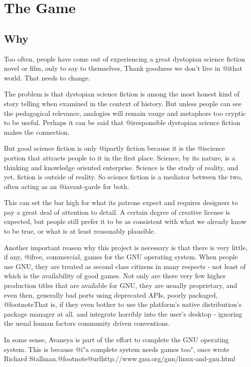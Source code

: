 \chapter{The Game}

\section{Why}
Too often, people have come out of experiencing a great dystopian science fiction novel or film, only to say to themselves, Thank goodness we don't live in @i{that} world. That needs to change.

The problem is that dystopian science fiction is among the most honest kind of story telling when examined in the context of history. But unless people can see the pedagogical relevance, analogies will remain vauge and metaphors too cryptic to be useful. Perhaps it can be said that @i{responsible} dystopian science fiction makes the connection.

But good science fiction is only @i{partly} fiction because it is the @i{science} portion that attracts people to it in the first place. Science, by its nature, is a thinking and knowledge oriented enterprise. Science is the study of reality, and yet, fiction is outside of reality. So science fiction is a mediator between the two, often acting as an @i{avant-garde} for both.

This can set the bar high for what its patrons expect and requires designers to pay a great deal of attention to detail. A certain degree of creative license is expected, but people still prefer it to be as consistent with what we already know to be true, or what is at least reasonably plausible.

Another important reason why this project is necessary is that there is very little, if any, @i{free}, commercial, games for the GNU operating system. When people use GNU, they are treated as second class citizens in many respects - not least of which is the availability of good games. Not only are there very few higher production titles that are available for GNU, they are usually proprietary, and even then, generally bad ports using deprecated APIs, poorly packaged, @footnote{That is, if they even bother to use the platform's native distribution's package manager at all.} and integrate horribly into the user's desktop - ignoring the usual human factors community driven conventions.

In some sense, Avaneya is part of the effort to complete the GNU operating system. This is because @i{"a complete system needs games too"}, once wrote Richard Stallman.@footnote{@url{http://www.gnu.org/gnu/linux-and-gnu.html}}

